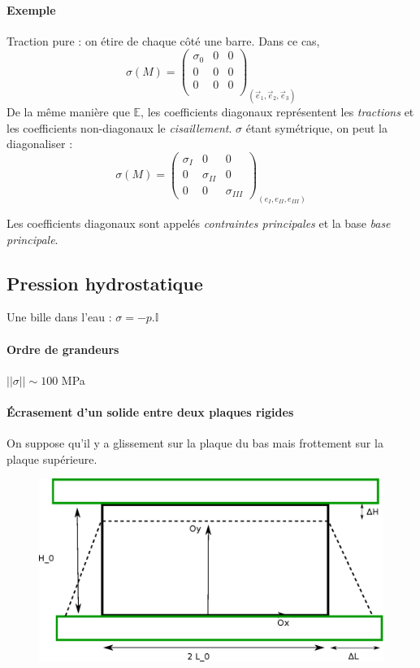 \documentclass{article}
\begin{document}
\paragraph{Exemple} Traction pure : on étire de chaque côté une barre. Dans ce cas,
\[\sigma(M) = \begin{pmatrix}
\sigma_0 & 0 & 0\\
0 & 0 & 0\\
0 & 0 & 0\\
\end{pmatrix}_{(\vec{e}_1, \vec{e}_2, \vec{e}_3)}\]
\bigskip
De la même manière que $\mathbb{E}$, les coefficients diagonaux représentent les \emph{tractions} et les coefficients non-diagonaux le \emph{cisaillement}.
$\sigma$ étant symétrique, on peut la diagonaliser :
\[\sigma(M) = \begin{pmatrix}
\sigma_I & 0 & 0\\
0 & \sigma_{II} & 0\\
0 & 0 & \sigma_{III}
\end{pmatrix}_{(e_I, e_{II}, e_{III})}
\]

Les coefficients diagonaux sont appelés \emph{contraintes principales} et la base \emph{base principale}.


\subsection{Pression hydrostatique}
Une bille dans l'eau : $\sigma = -p.\mathbb{I}$


\paragraph{Ordre de grandeurs} $|| \sigma || \sim 100$ MPa


\paragraph{Écrasement d'un solide entre deux plaques rigides} On suppose qu'il y a glissement sur la plaque du bas mais frottement sur la plaque supérieure.
\begin{figure}[!h]
\centering
\includegraphics[width=0.6\linewidth]{deux_plaques.eps}
\end{figure}
\end{document}

